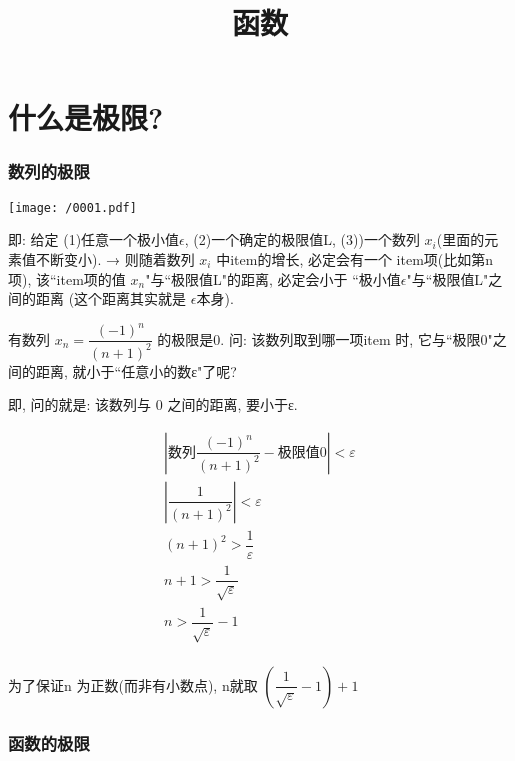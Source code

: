 \documentclass[UTF8]{ctexart}
\title{函数}
\begin{document}
	\tableofcontents %
	\date{} %
	\maketitle  %



\part{什么是极限?}

\section{数列的极限}

\texttt{[image: /0001.pdf]}

即: 给定 (1)任意一个极小值$\epsilon $, (2)一个确定的极限值L, (3))一个数列 $ x_i $(里面的元素值不断变小). → 则随着数列 
$ x_i $ 中item的增长, 必定会有一个 item项(比如第n项), 该``item项的值 $ x_n$"与``极限值L"的距离, 必定会小于 ``极小值$\epsilon $"与``极限值L"之间的距离 (这个距离其实就是 $\epsilon $本身). \\



\begin{myEnvSample}
	有数列 $x_n=\dfrac{(-1)^n} {(n+1)^2} $  的极限是0.  问: 该数列取到哪一项item 时, 它与``极限0"之间的距离, 就小于``任意小的数ε"了呢?
	
	即, 问的就是: 该数列与 0 之间的距离, 要小于ε.
	
	
	\[
		\begin{matrix}
			\left| \text{数列}\dfrac{\left( -1 \right) ^n}{\left( n+1 \right) ^2}-\text{极限值}0 \right|<\varepsilon\\
			\left| \dfrac{1}{\left( n+1 \right) ^2} \right|<\varepsilon\\
			\left( n+1 \right) ^2>\dfrac{1}{\varepsilon}\\
			n+1>\dfrac{1}{\sqrt{\varepsilon}}\\
			n>\dfrac{1}{\sqrt{\varepsilon}}-1\\
		\end{matrix}
	\]
	
	为了保证n 为正数(而非有小数点), n就取 $\left( \dfrac{1}{\sqrt{\varepsilon}}-1 \right) +1$	
\end{myEnvSample}




\section{函数的极限}
\end{document}
